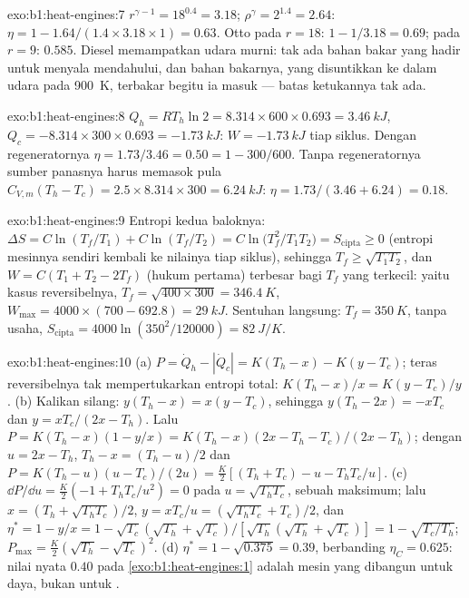 \begin{solution}{exo:b1:heat-engines:7}
$r^{\gamma-1} = 18^{0.4} = 3.18$; $\rho^\gamma = 2^{1.4} = 2.64$: $\eta = 1 -
1.64/(1.4 \times 3.18 \times 1) = 0.63$. Otto pada $r = 18$: $1 - 1/3.18 = 0.69$;
pada $r = 9$: $0.585$. Diesel memampatkan udara murni: tak ada bahan bakar yang hadir untuk
menyala mendahului, dan bahan bakarnya, yang disuntikkan ke dalam udara pada \qty{900}{K}, terbakar begitu ia
masuk --- batas ketukannya tak ada.
\end{solution}

\begin{solution}{exo:b1:heat-engines:8}
$Q_h = RT_h\ln2 = 8.314 \times 600 \times 0.693 = \qty{3.46}{kJ}$, $Q_c = -8.314
\times 300 \times 0.693 = \qty{-1.73}{kJ}$: $W = \qty{-1.73}{kJ}$ tiap siklus. Dengan
regeneratornya $\eta = 1.73/3.46 = 0.50 = 1 - 300/600$. Tanpa regeneratornya sumber
panasnya harus memasok pula $C_{V,m}(T_h - T_c) = 2.5 \times 8.314 \times 300 =
\qty{6.24}{kJ}$: $\eta = 1.73/(3.46 + 6.24) = 0.18$.
\end{solution}

\begin{solution}{exo:b1:heat-engines:9}
Entropi kedua baloknya: $\Delta S = C\ln(T_f/T_1) + C\ln(T_f/T_2) =
C\ln\bigl(T_f^2/T_1T_2\bigr) = S_{\mathrm{cipta}} \geq 0$ (entropi mesinnya sendiri
kembali ke nilainya tiap siklus), sehingga $T_f \geq \sqrt{T_1T_2}$, dan
$W = C(T_1 + T_2 - 2T_f)$ (hukum pertama) terbesar bagi $T_f$ yang terkecil:
yaitu kasus reversibelnya, $T_f = \sqrt{400 \times 300} = \qty{346.4}{K}$,
$W_{\max} = 4000 \times (700 - 692.8) = \qty{29}{kJ}$. Sentuhan langsung: $T_f =
\qty{350}{K}$, tanpa usaha, $S_{\mathrm{cipta}} = 4000\ln(350^2/120000) =
\qty{82}{J/K}$.
\end{solution}

\begin{solution}{exo:b1:heat-engines:10}
(a) $P = \dot Q_h - |\dot Q_c| = K(T_h - x) - K(y - T_c)$; teras reversibelnya
tak mempertukarkan entropi total: $K(T_h - x)/x = K(y - T_c)/y$. (b) Kalikan silang:
$y(T_h - x) = x(y - T_c)$, sehingga $y(T_h - 2x) = -xT_c$ dan $y = xT_c/(2x - T_h)$.
Lalu $P = K(T_h - x)(1 - y/x) = K(T_h - x)(2x - T_h - T_c)/(2x - T_h)$; dengan
$u = 2x - T_h$, $T_h - x = (T_h - u)/2$ dan $P = K(T_h - u)(u - T_c)/(2u) =
\tfrac{K}{2}[(T_h + T_c) - u - T_hT_c/u]$. (c) $\dd P/\dd u = \tfrac K2(-1 +
T_hT_c/u^2) = 0$ pada $u = \sqrt{T_hT_c}$, sebuah maksimum; lalu $x = (T_h +
\sqrt{T_hT_c})/2$, $y = xT_c/u = (\sqrt{T_hT_c} + T_c)/2$, dan $\eta^\ast = 1 - y/x
= 1 - \sqrt{T_c}(\sqrt{T_h} + \sqrt{T_c})/[\sqrt{T_h}(\sqrt{T_h} + \sqrt{T_c})] = 1 -
\sqrt{T_c/T_h}$; $P_{\max} = \tfrac K2(\sqrt{T_h} - \sqrt{T_c})^2$. (d)
$\eta^\ast = 1 - \sqrt{0.375} = 0.39$, berbanding $\eta_C = 0.625$: nilai nyata $0.40$
pada \cref{exo:b1:heat-engines:1} adalah mesin yang dibangun untuk daya, bukan untuk
.
\end{solution}

